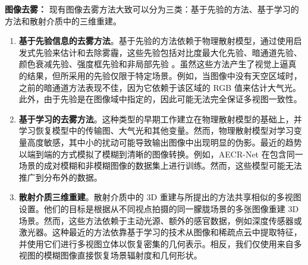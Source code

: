 \textbf{图像去雾：}
现有图像去雾方法大致可以分为三类：基于先验的方法、基于学习的方法和散射介质中的三维重建。
\begin{enumerate}
    \item \textbf{基于先验信息的去雾方法}。基于先验的方法依赖于物理散射模型，通过使用启发式先验来估计和去除雾霾，这些先验包括对比度最大化先验、暗通道先验、颜色衰减先验、强度框先验和非局部先验 \cite{kaiming_he_single_2009, nishino_bayesian_2012, fattal_dehazing_2015, wu_contrastive_2021}。虽然这些方法产生了视觉上逼真的结果，但所采用的先验仅限于特定场景。例如，当图像中没有天空区域时，之前的暗通道方法表现不佳\cite{kaiming_he_single_2009}，因为它依赖于该区域的 RGB 值来估计大气光。此外，由于先验是在图像域中指定的，因此可能无法完全保证多视图一致性。
    \item \textbf{基于学习的去雾方法}。这种类型的早期工作\cite{cai_dehazenet_2016, fujimura_dehazing_2021, dong_multi-scale_2020, li_aod-net_2017, liu_griddehazenet_2019, qin_ffa-net_2020, qu_enhanced_2019, ren_gated_2018, ren_single_2020, zhang_densely_2018}建立在物理散射模型的基础上，并学习恢复模型中的传输图、大气光和其他变量。然而，物理散射模型对学习变量高度敏感，其中小的扰动可能导致输出图像中出现明显的伪影。最近的趋势\cite{song_vision_2022, liu_griddehazenet_2019, chen_gated_2019, deng_hardgan_2020, dong_multi-scale_2020, qin_ffa-net_2020, wu_contrastive_2021, wang_eaa-net_2021} 以端到端的方式模拟了模糊到清晰的图像转换。例如，AECR-Net \cite{wu_contrastive_2021} 在包含同一场景的成对模糊和非模糊图像的数据集上进行训练。然而，这些模型可能无法推广到分布外的数据。
    \item \textbf{散射介质三维重建}。散射介质中的 3D 重建与所提出的方法共享相似的多视图设置。他们的目标是根据从不同视点拍摄的同一朦胧场景的多张图像重建 3D 场景。然而，这些方法依赖于主动光源\cite{murez_photometric_2017, narasimhan_structured_2005, fujimura_photometric_2018, tsiotsios_backscatter_2014}、额外的感官数据，例如深度传感器或激光器\cite{caraffa_stereo_2013, li_simultaneous_2015, heide_imaging_2014, satat_towards_2018, wang_programmable_2018}。这种最近的方法\cite{fujimura_dehazing_2021, caraffa_stereo_2013, song_deep_2019, li_simultaneous_2015}依靠基于学习的技术从图像和稀疏点云中提取特征，并使用它们进行多视图立体以恢复密集的几何表示。相反，我们仅使用来自多视图的模糊图像直接恢复场景辐射度和几何形状。
\end{enumerate}

